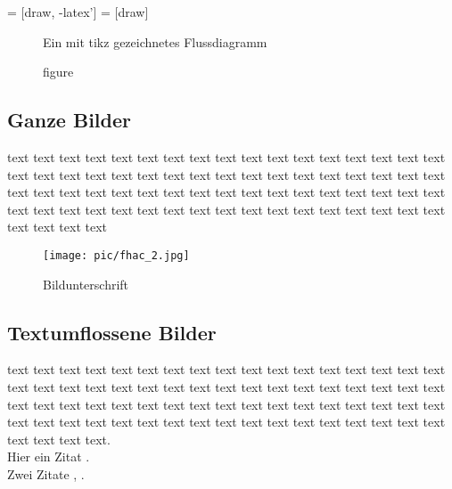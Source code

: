 	 = [draw, -latex']
	 = [draw]

\begin{figure}[H]
\begin{center}
\caption{figure}{Ein mit tikz gezeichnetes Flussdiagramm}
\label{bild2}
\end{center}
\end{figure}


\subsection{Ganze Bilder}
text text text text text text text text text text text text text text text text text text text text text text text text text text text text text text text text text text text text text text text text text text text text text text text text text text text text text text text text text text text text text text text text text text text text text text text text

\begin{figure}[H]
	\centering
		\texttt{[image: pic/fhac\_2.jpg]}
	\caption{Bildunterschrift}
	\label{fig:fhaachen}
\end{figure}
\vspace{1cm} %

\newpage


\subsection*{Textumflossene Bilder }


text text text text text text text text text text text text text text text text text text text text text text text text text text text text text text text text text text text text text text text text text text text text text text text text text text text text text text text text text text text text text text text text text text text text text text text text.\\
Hier ein Zitat \cite{book}. \\
Zwei Zitate \cite{book}, \cite{manual}.\\


